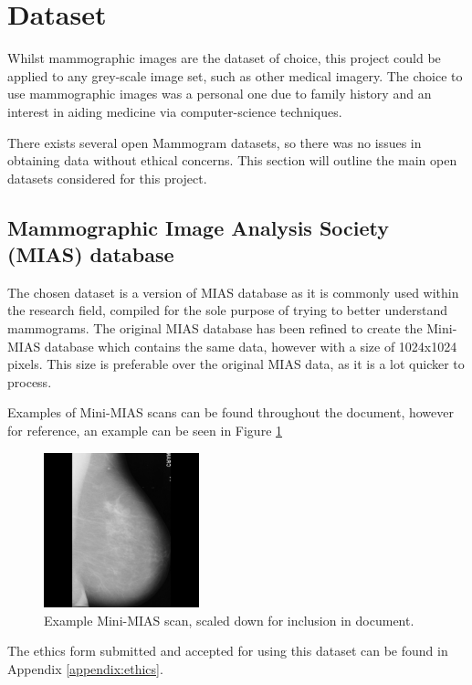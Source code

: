 \section{Dataset}

Whilst mammographic images are the dataset of choice, this project could be applied to any grey-scale image set, such as other medical imagery. The choice to use mammographic images was a personal one due to family history and an interest in aiding medicine via computer-science techniques.

There exists several open Mammogram datasets, so there was no issues in obtaining data without ethical concerns. This section will outline the main open datasets considered for this project.

\subsection{Mammographic Image Analysis Society (MIAS) database}

The chosen dataset is a version of \acrfull{MIAS} database as it is commonly used within the research field, compiled for the sole purpose of trying to better understand mammograms. The original \acrshort{MIAS} database has been refined to create the Mini-\acrshort{MIAS} database which contains the same data, however with a size of 1024x1024 pixels. This size is preferable over the original \acrshort{MIAS} data, as it is a lot quicker to process.

Examples of Mini-\acrshort{MIAS} scans can be found throughout the document, however for reference, an example can be seen in Figure \ref{fig:mini-mias}

\begin{figure}[H]
  \centering
  \includegraphics[width=0.4\textwidth]{Chapter2/tools/mias.jpg}
  \caption{Example Mini-MIAS scan, scaled down for inclusion in document.}
  \label{fig:mini-mias}
\end{figure}

The ethics form submitted and accepted for using this dataset can be found in Appendix \ref{appendix:ethics}.

